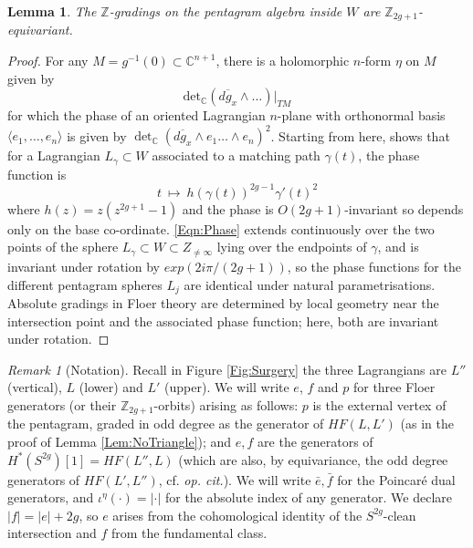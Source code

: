 \documentclass[reqno,10pt]{amsart}
\numberwithin{equation}{section}
\newcommand{\bC}{{\mathbb C}}
\newcommand{\bZ}{{\mathbb Z}}
\newtheorem{Lemma}[thm]{Lemma}
\theoremstyle{remark}
\newtheorem{Remark}[thm]{Remark}
\begin{document}
\begin{Lemma} \label{Lem:Bigrade}
The $\bZ$-gradings on the pentagram algebra inside $W$ are $\bZ_{2g+1}$-equivariant.
\end{Lemma}

\begin{proof}
For any $M=g^{-1}(0) \subset \bC^{n+1}$, there is a holomorphic $n$-form $\eta$ on $M$  given by 
\begin{equation} \label{Eqn:VolForm}
\textrm{det} _{\bC} (\overline{dg_x} \wedge \ldots ) |_{TM}
\end{equation}
for which the phase of an oriented Lagrangian $n$-plane with orthonormal basis $\langle e_1,\ldots, e_n\rangle$ is given by $\det_{\bC} (\overline{dg_x} \wedge e_1 \ldots \wedge e_n)^2$.  Starting from here, \cite[Equation 6.5]{KhovanovSeidel} shows that for a Lagrangian $L_{\gamma} \subset W$ associated to a matching path $\gamma(t)$, the phase function is
\begin{equation} \label{Eqn:Phase}
t\ \mapsto \ h(\gamma(t))^{2g-1}\gamma'(t)^2
\end{equation}
where $h(z) = z(z^{2g+1}-1)$ and the phase is $O(2g+1)$-invariant so depends only on the base co-ordinate.  \eqref{Eqn:Phase} extends continuously over the two points of the sphere $L_{\gamma} \subset W \subset Z_{\neq\infty}$ lying over the endpoints of $\gamma$, and  is invariant under rotation by $exp(2i\pi/(2g+1))$, so the phase functions for the different pentagram spheres $L_j$ are identical under natural parametrisations. Absolute gradings in Floer theory are determined by local geometry near the intersection point and the associated phase function; here, both are invariant under rotation.
\end{proof}

\begin{Remark}[Notation] Recall in Figure \ref{Fig:Surgery} the three Lagrangians are $L''$ (vertical), $L$ (lower) and $L'$ (upper).  We will write $e$, $f$ and $p$ for three Floer generators (or their $\bZ_{2g+1}$-orbits) arising as follows:  $p$ is the external vertex of the pentagram, graded in odd degree as the generator of $HF(L,L')$ (as in the proof of Lemma \ref{Lem:NoTriangle}); and $e, f$ are the generators of $H^*(S^{2g})[1] = HF(L'',L)$ (which are also, by equivariance, the odd degree generators of $HF(L', L'')$, cf. \emph{op. cit.}).  We will write $\bar{e}, \bar{f}$ for the Poincar\'e dual generators, and $\iota^{\eta}(\cdot) = |\cdot|$ for the absolute index of any generator. We declare $|f| = |e|+2g$, so $e$ arises from the cohomological identity of the $S^{2g}$-clean intersection and $f$ from the fundamental class.
\end{Remark}
\end{document}
